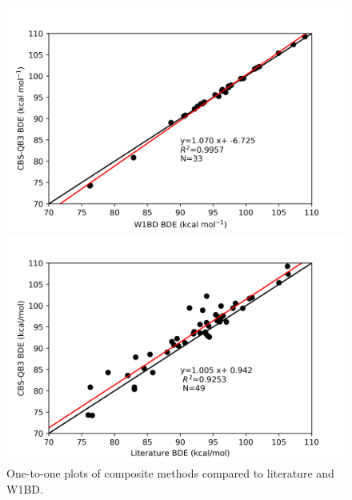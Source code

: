 \begin{figure}[H]
\hspace*{-1.8cm}
\begin{minipage}{8cm}
  \centering
  \includegraphics[width=\textwidth]{figures/w1bd-cbsqb3}
\end{minipage}%
\begin{minipage}{8cm}
  \centering
  \includegraphics[width=\textwidth]{figures/lit-cbsqb3}
\end{minipage}
\caption{One-to-one plots of composite methods compared to literature and W1BD.}
\end{figure}

